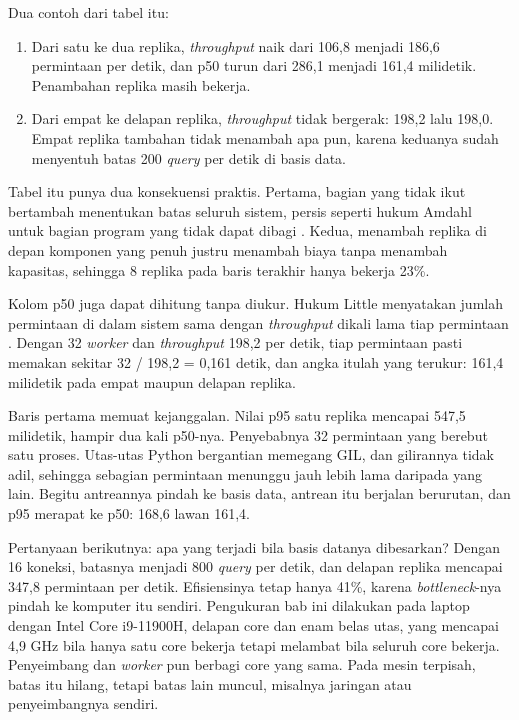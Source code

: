Dua contoh dari tabel itu:
\begin{enumerate}
  \item Dari satu ke dua replika, \textit{throughput} naik dari 106,8 menjadi
        186,6 permintaan per detik, dan p50 turun dari 286,1 menjadi 161,4
        milidetik. Penambahan replika masih bekerja.
  \item Dari empat ke delapan replika, \textit{throughput} tidak bergerak:
        198,2 lalu 198,0. Empat replika tambahan tidak menambah apa pun,
        karena keduanya sudah menyentuh batas 200 \textit{query} per detik di
        basis data.
\end{enumerate}

Tabel itu punya dua konsekuensi praktis. Pertama, bagian yang tidak ikut
bertambah menentukan batas seluruh sistem, persis seperti hukum Amdahl untuk
bagian program yang tidak dapat dibagi \cite{amdahl1967validity}. Kedua,
menambah replika di depan komponen yang penuh justru menambah biaya tanpa
menambah kapasitas, sehingga 8 replika pada baris terakhir hanya bekerja 23\%.

Kolom p50 juga dapat dihitung tanpa diukur. Hukum Little menyatakan jumlah
permintaan di dalam sistem sama dengan \textit{throughput} dikali lama tiap
permintaan \cite{little1961proof}. Dengan 32 \textit{worker} dan
\textit{throughput} 198,2 per detik, tiap permintaan pasti memakan sekitar
32 / 198,2 = 0,161 detik, dan angka itulah yang terukur: 161,4 milidetik pada
empat maupun delapan replika.

Baris pertama memuat kejanggalan. Nilai p95 satu replika mencapai 547,5
milidetik,
hampir dua kali p50-nya. Penyebabnya 32 permintaan yang berebut satu proses.
Utas-utas Python bergantian memegang GIL, dan gilirannya tidak adil, sehingga
sebagian permintaan menunggu jauh lebih lama daripada yang lain. Begitu
antreannya pindah ke basis data, antrean itu berjalan berurutan, dan p95
merapat ke p50: 168,6 lawan 161,4.

Pertanyaan berikutnya: apa yang terjadi bila basis datanya dibesarkan?
Dengan 16 koneksi, batasnya menjadi 800 \textit{query} per detik, dan
delapan replika mencapai 347,8 permintaan per detik. Efisiensinya tetap hanya
41\%, karena \textit{bottleneck}-nya pindah ke komputer itu sendiri.
Pengukuran bab ini dilakukan pada laptop dengan Intel Core i9-11900H, delapan
core dan enam belas utas, yang mencapai 4,9 GHz bila hanya satu core bekerja
tetapi melambat bila seluruh core bekerja. Penyeimbang dan \textit{worker} pun
berbagi core yang sama. Pada mesin terpisah, batas itu hilang, tetapi batas
lain muncul, misalnya jaringan atau penyeimbangnya sendiri.

